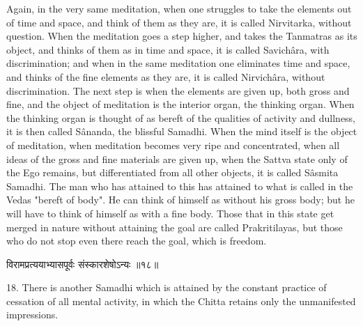 Again, in the very same meditation, when one struggles to take
the elements out of time and space, and think of them as they are, it
is called Nirvitarka, without question. When the meditation goes a step
higher, and takes the Tanmatras as its object, and thinks of them as in
time and space, it is called Savichâra, with discrimination; and when
in the same meditation one eliminates time and space, and thinks of the
fine elements as they are, it is called Nirvichâra, without
discrimination. The next step is when the elements are given up, both
gross and fine, and the object of meditation is the interior organ, the
thinking organ. When the thinking organ is thought of as bereft of the
qualities of activity and dullness, it is then called
Sânanda, the blissful Samadhi. When the mind itself is the object of
meditation, when meditation becomes very ripe and concentrated, when
all ideas of the gross and fine materials are given up, when the Sattva
state only of the Ego remains, but differentiated from all other
objects, it is called Sâsmita Samadhi. The man who has attained to this
has attained to what is called in the Vedas "bereft of body". He can
think of himself as without his gross body; but he will have to think
of himself as with a fine body. Those that in this state get merged in
nature without attaining the goal are called Prakritilayas, but those
who do not stop even there reach the goal, which is freedom. \\

\begin{center}
\begin{sanskrit}
विरामप्रत्ययाभ्यासपूर्वः संस्कारशेषोऽन्यः
॥१८॥
\end{sanskrit}
\end{center}
18. There is another Samadhi which is attained by the constant
practice of cessation of all mental activity, in which the Chitta
retains only the unmanifested impressions. \\

